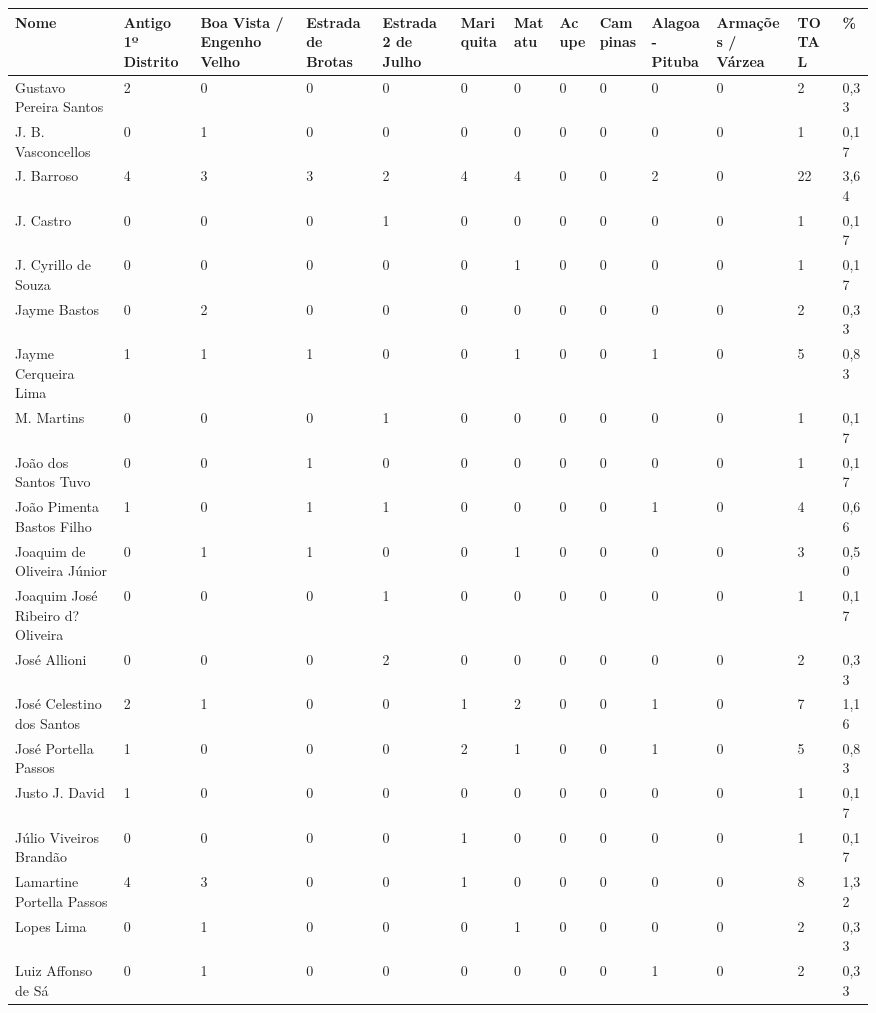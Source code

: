 \begin{table}[!htp]
{
\begin{tabular}{lllllllllllll}
\toprule
Nome	&Antigo 1º Distrito	&Boa Vista / Engenho Velho	&Estrada de Brotas	&Estrada 2 de Julho	&Mariquita	&Matatu	&Acupe	&Campinas	&Alagoa-Pituba	&Armações / Várzea	&TOTAL	&\%\\
\midrule
\midrule
Gustavo Pereira Santos	&2	&0	&0	&0	&0	&0	&0	&0	&0	&0	&2	&0,33\\
J. B. Vasconcellos	&0	&1	&0	&0	&0	&0	&0	&0	&0	&0	&1	&0,17\\
J. Barroso	&4	&3	&3	&2	&4	&4	&0	&0	&2	&0	&22	&3,64\\
J. Castro	&0	&0	&0	&1	&0	&0	&0	&0	&0	&0	&1	&0,17\\
J. Cyrillo de Souza	&0	&0	&0	&0	&0	&1	&0	&0	&0	&0	&1	&0,17\\
Jayme Bastos	&0	&2	&0	&0	&0	&0	&0	&0	&0	&0	&2	&0,33\\
Jayme Cerqueira Lima	&1	&1	&1	&0	&0	&1	&0	&0	&1	&0	&5	&0,83\\
M. Martins	&0	&0	&0	&1	&0	&0	&0	&0	&0	&0	&1	&0,17\\
João dos Santos Tuvo	&0	&0	&1	&0	&0	&0	&0	&0	&0	&0	&1	&0,17\\
João Pimenta Bastos Filho	&1	&0	&1	&1	&0	&0	&0	&0	&1	&0	&4	&0,66\\
Joaquim de Oliveira Júnior	&0	&1	&1	&0	&0	&1	&0	&0	&0	&0	&3	&0,50\\
Joaquim José Ribeiro d?Oliveira	&0	&0	&0	&1	&0	&0	&0	&0	&0	&0	&1	&0,17\\
José Allioni	&0	&0	&0	&2	&0	&0	&0	&0	&0	&0	&2	&0,33\\
José Celestino dos Santos	&2	&1	&0	&0	&1	&2	&0	&0	&1	&0	&7	&1,16\\
José Portella Passos	&1	&0	&0	&0	&2	&1	&0	&0	&1	&0	&5	&0,83\\
Justo J. David	&1	&0	&0	&0	&0	&0	&0	&0	&0	&0	&1	&0,17\\
Júlio Viveiros Brandão	&0	&0	&0	&0	&1	&0	&0	&0	&0	&0	&1	&0,17\\
Lamartine Portella Passos	&4	&3	&0	&0	&1	&0	&0	&0	&0	&0	&8	&1,32\\
Lopes Lima	&0	&1	&0	&0	&0	&1	&0	&0	&0	&0	&2	&0,33\\
Luiz Affonso de Sá	&0	&1	&0	&0	&0	&0	&0	&0	&1	&0	&2	&0,33\\

\end{tabular}}
\end{table}
